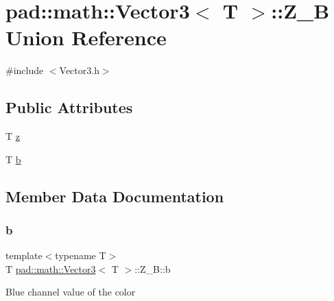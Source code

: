 \hypertarget{unionpad_1_1math_1_1_vector3_1_1_z___b}{}\section{pad\+:\+:math\+:\+:Vector3$<$ T $>$\+:\+:Z\+\_\+B Union Reference}
\label{unionpad_1_1math_1_1_vector3_1_1_z___b}


{\ttfamily \#include $<$Vector3.\+h$>$}

\subsection*{Public Attributes}
\begin{DoxyCompactItemize}
\item 
T \mbox{\hyperlink{unionpad_1_1math_1_1_vector3_1_1_z___b_a59d72f748572e5bb88e8d084798f585e}{z}}
\item 
T \mbox{\hyperlink{unionpad_1_1math_1_1_vector3_1_1_z___b_a426e4de0d95e2977ae436377eec886e4}{b}}
\end{DoxyCompactItemize}


\subsection{Member Data Documentation}
\mbox{\label{unionpad_1_1math_1_1_vector3_1_1_z___b_a426e4de0d95e2977ae436377eec886e4}} 
\subsubsection{\texorpdfstring{b}{b}}
{\footnotesize\ttfamily template$<$typename T$>$ \\
T \mbox{\hyperlink{structpad_1_1math_1_1_vector3}{pad\+::math\+::\+Vector3}}$<$ T $>$\+::Z\+\_\+\+B\+::b}

Blue channel value of the color \mbox{\label{unionpad_1_1math_1_1_vector3_1_1_z___b_a59d72f748572e5bb88e8d084798f585e}} 
